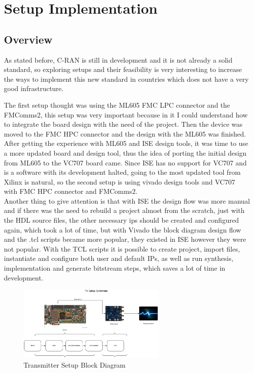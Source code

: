 \chapter{Setup Implementation}

\section{Overview}

As stated before, C-RAN is still in development and it is not already a solid
standard, so exploring setups and their feasibility is very interesting to
increase the ways to implement this new standard in countries which does not
have a very good infrastructure.

The first setup thought was using the ML605 FMC LPC connector and the FMComms2,
this setup was very important because in it I could understand how to integrate
the board design with the need of the project. Then the device was moved to the
FMC HPC connector and the design with the ML605 was finished.\\

After getting the experience with ML605 and ISE design tools, it was time to use
a more updated board and design tool, thus the idea of porting the initial
design from ML605 to the VC707 board came. Since ISE has no support for VC707
and is a software with its development halted, going to the most updated tool
from Xilinx is natural, so the second setup is using vivado design tools and
VC707 with FMC HPC connector and FMComms2.\\

Another thing to give attention is that with ISE the design flow was more manual
and if there was the need to rebuild a project almost from the scratch, just
with the HDL source files, the other necessary ips should be created and
configured again, which took a lot of time, but with Vivado the block diagram
design flow and the .tcl scripts became more popular, they existed in ISE
however they were not popular. With the TCL scripts it is possible to create
project, import files, instantiate and configure both user and default IPs, as
well as run synthesis, implementation and generate bitstream steps, which saves
a lot of time in development.\\


\begin{figure}[htbp]
    \centering
    \includegraphics[width=0.65\textwidth]{./figures/tx_setup}
    \caption{ Transmitter Setup Block Diagram
    \label{fig:txsetup}}
\end{figure}

